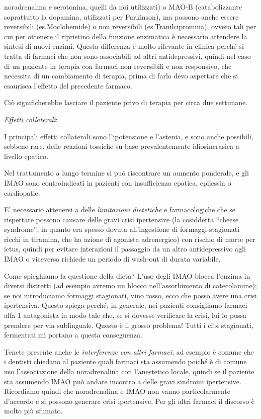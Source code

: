\documentclass[]{article}
\begin{document}
noradrenalina e serotonina, quelli da noi utilizzati) o MAO-B
(catabolizzante soprattutto la dopamina, utilizzati per Parkinson), ma
possono anche essere reversibili (es.Moclobemide) o non reversibili
(es.Tranilcipromina), ovvero tali per cui per ottenere il ripristino
della funzione enzimatica è necessario attendere la sintesi di nuovi
enzimi. Questa differenza è molto rilevante in clinica perché si tratta
di farmaci che non sono associabili ad altri antidepressivi, quindi nel
caso di un paziente in terapia con farmaci non reversibili e non
responsivo, che necessita di un cambiamento di terapia, prima di farlo
devo aspettare che si esaurisca l'effetto del precedente farmaco.

Ciò significherebbe lasciare il paziente privo di terapia per circa due
settimane.

\emph{\emph{Effetti collaterali}}:

I principali effetti collaterali sono l'ipotensione e l'astenia, e sono
anche possibili, sebbene rare, delle reazioni tossiche su base
prevalentemente idiosincrasica a livello epatico.

Nel trattamento a lungo termine si può riscontrare un aumento ponderale,
e gli IMAO sono controindicati in pazienti con insufficienza epatica,
epilessia o cardiopatie.

E' necessario attenersi a delle \emph{limitazioni dietetiche} e
farmacologiche che se rispettate possono causare delle gravi crisi
ipertensive (la cosiddetta ``cheese syndrome'', in quanto era spesso
dovuta all'ingestione di formaggi stagionati ricchi in tiramina, che ha
azione di agonista adrenergico) con rischio di morte per ictus, quindi
per evitare interazioni il passaggio da un altro antidepressivo agli
IMAO o viceversa richiede un periodo di wash-out di durata variabile.

Come spieghiamo la questione della dieta? L'uso degli IMAO blocca
l'enzima in diversi distretti (ad esempio avremo un blocco
nell'assorbimento di catecolamine); se noi introduciamo formaggi
stagionati, vino rosso, ecco che posso avere una crisi ipertensiva.
Questo spiega perché, in generale, nei pazienti consigliamo farmaci alfa
1 antagonista in modo tale che, se si dovesse verificare la crisi, lui
lo possa prendere per via sublinguale. Questo è il grosso problema!
Tutti i cibi stagionati, fermentati mi portano a questa conseguenza.

Tenete presente anche le \emph{interferenze con altri farmaci}; ad
esempio è comune che i dentisti chiedano al paziente quali farmaci sta
assumendo poiché è di comune uso l'associazione della noradrenalina con
l'anestetico locale, quindi se il paziente sta assumendo IMAO può andare
incontro a delle gravi sindromi ipertensive. Ricordiamo quindi che
noradrenalina e IMAO non vanno particolarmente d'accordo e si possono
generare crisi ipertensive. Per gli altri farmaci il discorso è molto
più sfumato.
\end{document}
